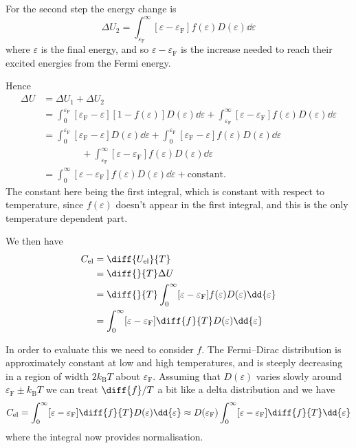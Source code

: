 \documentclass[fleqn]{NotesClass}
\newcommand*{\boltzmann}{k_{\mathrm{B}}}
\newcommand*{\fermi}{\mathrm{F}}
\begin{document}
    For the second step the energy change is
    \begin{equation}
        \Delta U_2 = \int_{\varepsilon_{\fermi}}^{\infty} [\varepsilon - \varepsilon_{\fermi}]f(\varepsilon)D(\varepsilon) \dd{\varepsilon}
    \end{equation}
    where \(\varepsilon\) is the final energy, and so \(\varepsilon - \varepsilon_{\fermi}\) is the increase needed to reach their excited energies from the Fermi energy.
    
    Hence
    \begin{align}
        \Delta U &= \Delta U_1 + \Delta U_2\\
        &= \int_{0}^{\varepsilon_{\fermi}} [\varepsilon_{\fermi} - \varepsilon][1 - f(\varepsilon)]D(\varepsilon) \dd{\varepsilon} + \int_{\varepsilon_{\fermi}}^{\infty} [\varepsilon - \varepsilon_{\fermi}]f(\varepsilon)D(\varepsilon) \dd{\varepsilon}\\
        &= \int_{0}^{\varepsilon_{\fermi}} [\varepsilon_{\fermi} - \varepsilon]D(\varepsilon) \dd{\varepsilon} + \int_{0}^{\varepsilon_{\fermi}} [\varepsilon_{\fermi} - \varepsilon] f(\varepsilon)D(\varepsilon) \dd{\varepsilon}\\
        &\qquad\qquad+ \int_{\varepsilon_{\fermi}}^{\infty} [\varepsilon - \varepsilon_{\fermi}]f(\varepsilon)D(\varepsilon) \dd{\varepsilon}\\
        &= \int_{0}^{\infty} [\varepsilon - \varepsilon_{\fermi}] f(\varepsilon)D(\varepsilon) \dd{\varepsilon} + \text{constant}.
    \end{align}
    The constant here being the first integral, which is constant with respect to temperature, since \(f(\varepsilon)\) doesn't appear in the first integral, and this is the only temperature dependent part.
    
    We then have
    \begin{align}
        C_{\mathrm{el}} &= \diff{U_{\mathrm{el}}}{T}\\
        &= \diff{}{T}\Delta U\\
        &= \diff{}{T} \int_{0}^{\infty} [\varepsilon - \varepsilon_{\fermi}]f(\varepsilon)D(\varepsilon) \dd{\varepsilon}\\
        &= \int_{0}^{\infty} [\varepsilon - \varepsilon_{\fermi}] \diff{f}{T} D(\varepsilon)\dd{\varepsilon}
    \end{align}

    In order to evaluate this we need to consider \(f\).
    The Fermi--Dirac distribution is approximately constant at low and high temperatures, and is steeply decreasing in a region of width \(2\boltzmann T\) about \(\varepsilon_{\fermi}\).
    Assuming that \(D(\varepsilon)\) varies slowly around\(\varepsilon_{\fermi} \pm \boltzmann T\) we can treat \(\diff{f}/{T}\) a bit like a delta distribution and we have
    \begin{equation}
        C_{\mathrm{el}} = \int_{0}^{\infty} [\varepsilon - \varepsilon_{\fermi}] \diff{f}{T} D(\varepsilon)\dd{\varepsilon} \approx D(\varepsilon_{\fermi}) \int_{0}^{\infty} [\varepsilon - \varepsilon_{\fermi}] \diff{f}{T} \dd{\varepsilon}
    \end{equation}
    where the integral now provides normalisation.
    
\end{document}
